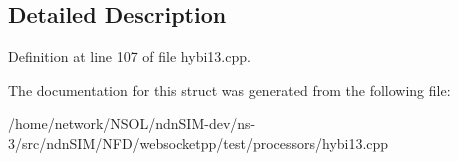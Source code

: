 \subsection{Detailed Description}


Definition at line 107 of file hybi13.\+cpp.



The documentation for this struct was generated from the following file\+:\begin{DoxyCompactItemize}
\item 
/home/network/\+N\+S\+O\+L/ndn\+S\+I\+M-\/dev/ns-\/3/src/ndn\+S\+I\+M/\+N\+F\+D/websocketpp/test/processors/hybi13.\+cpp\end{DoxyCompactItemize}
